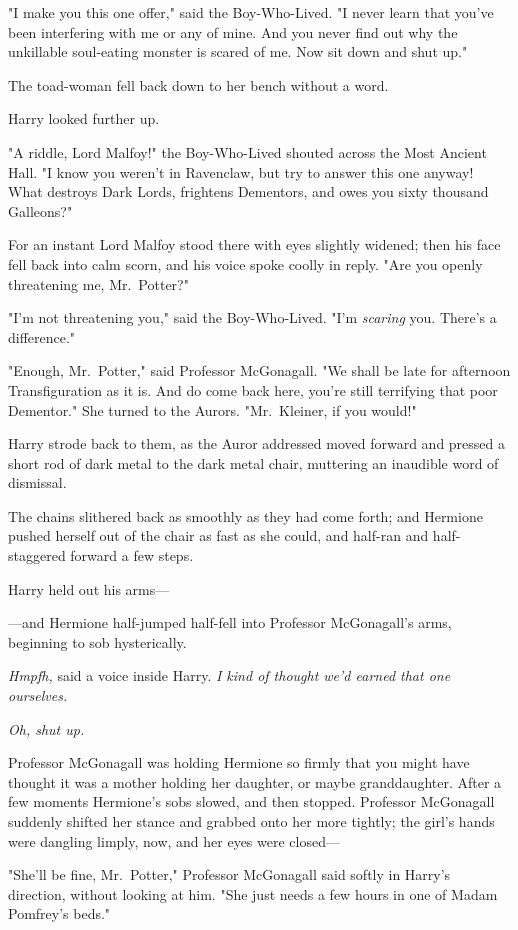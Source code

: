 "I make you this one offer," said the Boy-Who-Lived. "I never learn that you've
been interfering with me or any of mine. And you never find out why the
unkillable soul-eating monster is scared of me. Now sit down and shut up."

The toad-woman fell back down to her bench without a word.

Harry looked further up.

"A riddle, Lord Malfoy!" the Boy-Who-Lived shouted across the Most Ancient
Hall. "I know you weren't in Ravenclaw, but try to answer this one anyway! What
destroys Dark Lords, frightens Dementors, and owes you sixty thousand Galleons?"

For an instant Lord Malfoy stood there with eyes slightly widened; then his
face fell back into calm scorn, and his voice spoke coolly in reply. "Are you
openly threatening me, Mr.~Potter?"

"I'm not threatening you," said the Boy-Who-Lived. "I'm \emph{scaring} you.
There's a difference."

"Enough, Mr.~Potter," said Professor McGonagall. "We shall be late for
afternoon Transfiguration as it is. And do come back here, you're still
terrifying that poor Dementor." She turned to the Aurors. "Mr.~Kleiner, if you
would!"

Harry strode back to them, as the Auror addressed moved forward and pressed a
short rod of dark metal to the dark metal chair, muttering an inaudible word of
dismissal.

The chains slithered back as smoothly as they had come forth; and Hermione
pushed herself out of the chair as fast as she could, and half-ran and
half-staggered forward a few steps.

Harry held out his arms---

---and Hermione half-jumped half-fell into Professor McGonagall's arms,
beginning to sob hysterically.

\emph{Hmpfh,} said a voice inside Harry. \emph{I kind of thought we'd earned
that one ourselves.}

\emph{Oh, shut up.}

Professor McGonagall was holding Hermione so firmly that you might have thought
it was a mother holding her daughter, or maybe granddaughter. After a few
moments Hermione's sobs slowed, and then stopped. Professor McGonagall suddenly
shifted her stance and grabbed onto her more tightly; the girl's hands were
dangling limply, now, and her eyes were closed---

"She'll be fine, Mr.~Potter," Professor McGonagall said softly in Harry's
direction, without looking at him. "She just needs a few hours in one of Madam
Pomfrey's beds."

